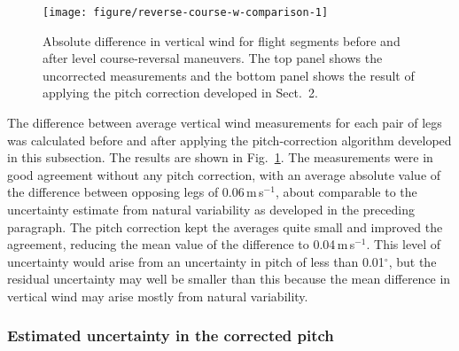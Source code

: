 \documentclass[english,british,amt,bookmarks=false,unicode=true]{copernicus}\usepackage[]{graphicx}\usepackage[]{color}
\makeatletter
\def\maxwidth{ %
  \ifdim\Gin@nat@width>\linewidth
    \linewidth
  \else
    \Gin@nat@width
  \fi
}
\newenvironment{knitrout}{}{} %
\makeatother
\begin{document}
\begin{knitrout}
\color{fgcolor}\begin{figure}
\texttt{[image: figure/reverse-course-w-comparison-1]} \caption[Absolute difference in vertical wind for flight segments before and after level course-reversal maneuvers]{Absolute difference in vertical wind for flight segments before and after level course-reversal maneuvers. The top panel shows the uncorrected measurements and the bottom panel shows the result of applying the pitch correction developed in Sect.\ 2.}\label{fig:reverse-course-w-comparison}
\end{figure}


\end{knitrout}

The difference between average vertical wind measurements for each
pair of legs was calculated before and after applying the pitch-correction
algorithm developed in this subsection. The results are shown in Fig.~\ref{fig:reverse-course-w-comparison}.
The measurements were in good agreement without any pitch correction,
with an average absolute value of the difference between opposing
legs of 0.06\,m\,s$^{-1}$,
about comparable to the uncertainty estimate from natural variability
as developed in the preceding paragraph. The pitch correction kept
the averages quite small and improved the agreement, reducing the
mean value of the difference to 0.04\,m\,s$^{-1}$.
This level of uncertainty would arise from an uncertainty in pitch
of less than 0.01$^{\circ}$, but the residual uncertainty may well
be smaller than this because the mean difference in vertical wind
may arise mostly from natural variability. 


\subsubsection{Estimated uncertainty in the corrected pitch}
\end{document}
